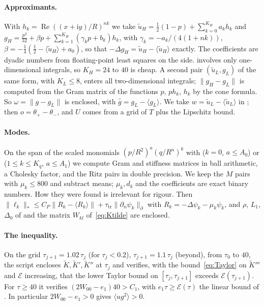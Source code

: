 \documentclass[11pt,a4paper]{report}
\DeclareRobustCommand*{\avg}[1]{\langle #1\rangle}
\DeclareRobustCommand*{\norm}[1]{\lVert #1\rVert}
\DeclareRobustCommand*{\bdnorm}[1]{\lVert #1\rVert_{\partial}}
\DeclareRobustCommand*{\dualnorm}[1]{\lVert #1\rVert_{*}}
\DeclareRobustCommand*{\ut}{\tilde u}
\begin{document}
\paragraph{Approximants.} With \(h_k=\operatorname{Re}((x+\mathrm iy)/R)^{nk}\) we take
\(\ut_H=\frac12(1-p)+\sum_{k=0}^{K_H}a_kh_k\) and
\(g_H=\frac{p^2}{32}+\beta p+\sum_{k=1}^{K_H}(\gamma_kp+b_k)h_k\), with \(\gamma_k=-a_k/(4(1+nk))\), \(\beta=-\frac14(\frac12-\avg{\ut_H}+a_0)\), so that
\(-\Delta g_H=\ut_H-\avg{\ut_H}\) exactly. The coefficients are dyadic numbers from floating-point least squares on the side.
 involves only one-dimensional integrals, so \(K_H=24\) to \(40\) is cheap. A second pair \((\ut_L,g_L)\) of the same form,
with \(K_L\le8\), enters all two-dimensional integrals; \(\norm{g_H-g_L}\) is computed from the Gram matrix of the functions
\(p\), \(ph_k\), \(h_k\) by the cone formula. So \(\omega=\norm{g-g_L}\) is enclosed, with \(\hat g=g_L-\avg{g_L}\). We take \(w=\ut_L-\avg{\ut_L}\)
in ; then \(o=\theta_+-\theta_-\), and \(U\) comes from a grid of \(T\) plus the Lipschitz bound.

\paragraph{Modes.} On the span of the scaled monomials \((p/R^2)^a(q/R^n)^k\) with (\(k=0\), \(a\le A_0\)) or
(\(1\le k\le K_q\), \(a\le A_1\)) we compute Gram and stiffness matrices in ball arithmetic, a Cholesky factor, and the Ritz pairs in
double precision. We keep the \(M\) pairs with \(\mu_k\le800\) and subtract means; \(\mu_k,d_k\) and the coefficients are exact binary
numbers. How they were found is irrelevant for rigour. Then \(\dualnorm{\ell_k}\le C_P\norm{R_k-\avg{R_k}}+\tau_{\mathrm{tr}}\bdnorm{\partial_n\psi_k}\) with
\(R_k=-\Delta\psi_k-\mu_k\psi_k\), and \(\rho\), \(L_1\), \(\Delta_0\) of  and the matrix \(W_{kl}\) of~\eqref{eq:Ktilde} are enclosed.

\paragraph{The inequality.} On the grid \(\tau_{j+1}=1.02\,\tau_j\) (for \(\tau_j<0.2\)), \(\tau_{j+1}=1.1\,\tau_j\) (beyond), from \(\tau_0\) to \(40\), the
script encloses \(\tilde K,\tilde K',\tilde K''\) at \(\tau_j\) and verifies, with the bound~\eqref{eq:Taylor} on \(\tilde K'''\) and \(\mathcal E\) increasing,
that the lower Taylor bound on \([\tau_j,\tau_{j+1}]\) exceeds \(\mathcal E(\tau_{j+1})\). For \(\tau\ge40\) it verifies
\((2W_{00}-e_1)40>C_1\), with \(e_1\tau\ge\mathcal E(\tau)\) the linear bound of . In particular \(2W_{00}-e_1>0\) gives \(\avg{ug^2}>0\).
\end{document}
